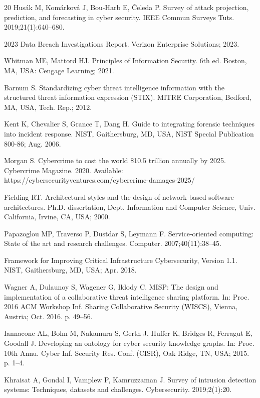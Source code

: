 \documentclass[pdflatex,sn-mathphys-num]{sn-jnl}%
\theoremstyle{thmstyleone}%
\theoremstyle{thmstyletwo}%
\theoremstyle{thmstylethree}%
\begin{document}
\begin{thebibliography}{20}
 Husák M, Komárková J, Bou-Harb E, Čeleda P. Survey of attack projection, prediction, and forecasting in cyber security. IEEE Commun Surveys Tuts. 2019;21(1):640--680.

 2023 Data Breach Investigations Report. Verizon Enterprise Solutions; 2023.

 Whitman ME, Mattord HJ. Principles of Information Security. 6th ed. Boston, MA, USA: Cengage Learning; 2021.

 Barnum S. Standardizing cyber threat intelligence information with the structured threat information expression (STIX). MITRE Corporation, Bedford, MA, USA, Tech. Rep.; 2012.

 Kent K, Chevalier S, Grance T, Dang H. Guide to integrating forensic techniques into incident response. NIST, Gaithersburg, MD, USA, NIST Special Publication 800-86; Aug. 2006.

 Morgan S. Cybercrime to cost the world \$10.5 trillion annually by 2025. Cybercrime Magazine. 2020. Available: https://cybersecurityventures.com/cybercrime-damages-2025/

 Fielding RT. Architectural styles and the design of network-based software architectures. Ph.D. dissertation, Dept. Information and Computer Science, Univ. California, Irvine, CA, USA; 2000.

 Papazoglou MP, Traverso P, Dustdar S, Leymann F. Service-oriented computing: State of the art and research challenges. Computer. 2007;40(11):38--45.

 Framework for Improving Critical Infrastructure Cybersecurity, Version 1.1. NIST, Gaithersburg, MD, USA; Apr. 2018.

 Wagner A, Dulaunoy S, Wagener G, Iklody C. MISP: The design and implementation of a collaborative threat intelligence sharing platform. In: Proc. 2016 ACM Workshop Inf. Sharing Collaborative Security (WISCS), Vienna, Austria; Oct. 2016. p. 49--56.

 Iannacone AL, Bohn M, Nakamura S, Gerth J, Huffer K, Bridges R, Ferragut E, Goodall J. Developing an ontology for cyber security knowledge graphs. In: Proc. 10th Annu. Cyber Inf. Security Res. Conf. (CISR), Oak Ridge, TN, USA; 2015. p. 1--4.

 Khraisat A, Gondal I, Vamplew P, Kamruzzaman J. Survey of intrusion detection systems: Techniques, datasets and challenges. Cybersecurity. 2019;2(1):20.


\end{thebibliography}
\end{document}
